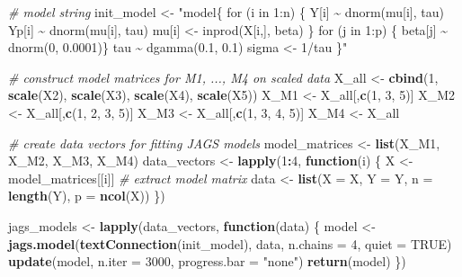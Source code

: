 \documentclass[
]{homework}
\newenvironment{Shaded}{\begin{snugshade}}{\end{snugshade}}
\newcommand{\AttributeTok}[1]{\textcolor[rgb]{0.13,0.29,0.53}{#1}}
\newcommand{\CommentTok}[1]{\textcolor[rgb]{0.56,0.35,0.01}{\textit{#1}}}
\newcommand{\ConstantTok}[1]{\textcolor[rgb]{0.56,0.35,0.01}{#1}}
\newcommand{\ControlFlowTok}[1]{\textcolor[rgb]{0.13,0.29,0.53}{\textbf{#1}}}
\newcommand{\DecValTok}[1]{\textcolor[rgb]{0.00,0.00,0.81}{#1}}
\newcommand{\FunctionTok}[1]{\textcolor[rgb]{0.13,0.29,0.53}{\textbf{#1}}}
\newcommand{\NormalTok}[1]{#1}
\newcommand{\OtherTok}[1]{\textcolor[rgb]{0.56,0.35,0.01}{#1}}
\newcommand{\SpecialCharTok}[1]{\textcolor[rgb]{0.81,0.36,0.00}{\textbf{#1}}}
\newcommand{\StringTok}[1]{\textcolor[rgb]{0.31,0.60,0.02}{#1}}
\begin{document}
\begin{Shaded}
\begin{Highlighting}[]
\CommentTok{\# model string}
\NormalTok{init\_model }\OtherTok{\textless{}{-}} \StringTok{"model\{}
\StringTok{  for (i in 1:n) \{}
\StringTok{    Y[i]  \textasciitilde{} dnorm(mu[i], tau)}
\StringTok{    Yp[i] \textasciitilde{} dnorm(mu[i], tau)}
\StringTok{    mu[i]   \textless{}{-} inprod(X[i,], beta)}
\StringTok{  \}}
\StringTok{  }
\StringTok{  for (j in 1:p) \{ beta[j] \textasciitilde{} dnorm(0, 0.0001)\}}
\StringTok{  }
\StringTok{  tau   \textasciitilde{} dgamma(0.1, 0.1)}
\StringTok{  sigma \textless{}{-} 1/tau}
\StringTok{\}"}

\CommentTok{\# construct model matrices for M1, ..., M4 on scaled data}
\NormalTok{X\_all }\OtherTok{\textless{}{-}} \FunctionTok{cbind}\NormalTok{(}\DecValTok{1}\NormalTok{, }\FunctionTok{scale}\NormalTok{(X2), }\FunctionTok{scale}\NormalTok{(X3), }\FunctionTok{scale}\NormalTok{(X4), }\FunctionTok{scale}\NormalTok{(X5))}
\NormalTok{X\_M1 }\OtherTok{\textless{}{-}}\NormalTok{ X\_all[,}\FunctionTok{c}\NormalTok{(}\DecValTok{1}\NormalTok{, }\DecValTok{3}\NormalTok{, }\DecValTok{5}\NormalTok{)]}
\NormalTok{X\_M2 }\OtherTok{\textless{}{-}}\NormalTok{ X\_all[,}\FunctionTok{c}\NormalTok{(}\DecValTok{1}\NormalTok{, }\DecValTok{2}\NormalTok{, }\DecValTok{3}\NormalTok{, }\DecValTok{5}\NormalTok{)]}
\NormalTok{X\_M3 }\OtherTok{\textless{}{-}}\NormalTok{ X\_all[,}\FunctionTok{c}\NormalTok{(}\DecValTok{1}\NormalTok{, }\DecValTok{3}\NormalTok{, }\DecValTok{4}\NormalTok{, }\DecValTok{5}\NormalTok{)]}
\NormalTok{X\_M4 }\OtherTok{\textless{}{-}}\NormalTok{ X\_all}

\CommentTok{\# create data vectors for fitting JAGS models}
\NormalTok{model\_matrices }\OtherTok{\textless{}{-}} \FunctionTok{list}\NormalTok{(X\_M1, X\_M2, X\_M3, X\_M4)}
\NormalTok{data\_vectors }\OtherTok{\textless{}{-}} \FunctionTok{lapply}\NormalTok{(}\DecValTok{1}\SpecialCharTok{:}\DecValTok{4}\NormalTok{, }\ControlFlowTok{function}\NormalTok{(i) \{}
\NormalTok{  X }\OtherTok{\textless{}{-}}\NormalTok{ model\_matrices[[i]] }\CommentTok{\# extract model matrix}
\NormalTok{  data }\OtherTok{\textless{}{-}} \FunctionTok{list}\NormalTok{(}\AttributeTok{X =}\NormalTok{ X, }\AttributeTok{Y =}\NormalTok{ Y, }\AttributeTok{n =} \FunctionTok{length}\NormalTok{(Y), }\AttributeTok{p =} \FunctionTok{ncol}\NormalTok{(X))}
\NormalTok{\})}

\NormalTok{jags\_models }\OtherTok{\textless{}{-}} \FunctionTok{lapply}\NormalTok{(data\_vectors, }\ControlFlowTok{function}\NormalTok{(data) \{}
\NormalTok{  model }\OtherTok{\textless{}{-}} \FunctionTok{jags.model}\NormalTok{(}\FunctionTok{textConnection}\NormalTok{(init\_model), data, }\AttributeTok{n.chains =} \DecValTok{4}\NormalTok{, }\AttributeTok{quiet =} \ConstantTok{TRUE}\NormalTok{)}
  \FunctionTok{update}\NormalTok{(model, }\AttributeTok{n.iter =} \DecValTok{3000}\NormalTok{, }\AttributeTok{progress.bar =} \StringTok{"none"}\NormalTok{)}
  \FunctionTok{return}\NormalTok{(model)}
\NormalTok{\})}
\end{Highlighting}
\end{Shaded}
\end{document}
